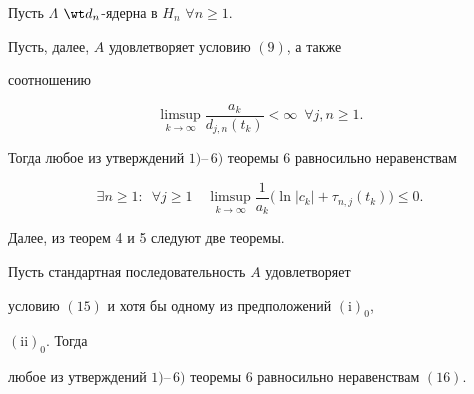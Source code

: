 \begin{thm}


Пусть $\Lambda$\; $\wt d_n$-ядерна в $H_n$ $\forall n\geqslant 1$.


Пусть, далее, $A$ удовлетворяет условию $(9)$, а также


соотношению


\begin{equation}


\limsup\limits_{k\to\infty}\dfrac{a_k}


{d_{j,n}(t_k)}<\infty\ \; \forall j,n\geqslant 1.


\end{equation}


Тогда любое из утверждений $1)$--\,$6)$ теоремы $6$ равносильно неравенствам


\begin{equation}


\exists n\geqslant 1:\ \;\forall j\geqslant 1 \quad


\limsup\limits_{k\to\infty}\dfrac{1}{a_k}


\bigl(\ln|c_k|+\tau_{n,j}(t_k)\bigr)\leqslant 0.


\end{equation}


\end{thm}





Далее, из теорем 4 и 5 следуют две теоремы.





\begin{thm}


Пусть стандартная последовательность $A$ удовлетворяет


условию $(15)$ и хотя бы одному из предположений $(\mathrm i)_0$,


$(\mathrm{ii})_0$. Тогда


любое из утверждений $1)$--\,$6)$ теоремы $6$ равносильно неравенствам $(16)$.


\end{thm}





